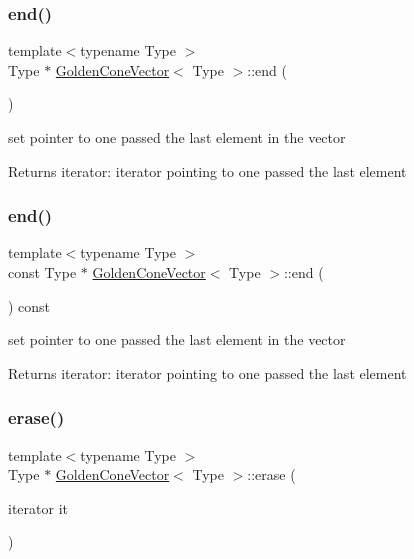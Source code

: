 \subsubsection{\texorpdfstring{end()}{end()}\hspace{0.1cm}{\footnotesize\ttfamily [1/2]}}
{\footnotesize\ttfamily template$<$typename Type $>$ \\
Type $\ast$ \mbox{\hyperlink{class_golden_cone_vector}{Golden\+Cone\+Vector}}$<$ Type $>$\+::end (\begin{DoxyParamCaption}{ }\end{DoxyParamCaption})}



set pointer to one passed the last element in the vector 

\begin{DoxyReturn}{Returns}
iterator\+: iterator pointing to one passed the last element 
\end{DoxyReturn}
\mbox{\label{class_golden_cone_vector_a7962ba599356afbbfc2e21ac58fceb2b}} 
\subsubsection{\texorpdfstring{end()}{end()}\hspace{0.1cm}{\footnotesize\ttfamily [2/2]}}
{\footnotesize\ttfamily template$<$typename Type $>$ \\
const Type $\ast$ \mbox{\hyperlink{class_golden_cone_vector}{Golden\+Cone\+Vector}}$<$ Type $>$\+::end (\begin{DoxyParamCaption}{ }\end{DoxyParamCaption}) const}



set pointer to one passed the last element in the vector 

\begin{DoxyReturn}{Returns}
iterator\+: iterator pointing to one passed the last element 
\end{DoxyReturn}
\mbox{\label{class_golden_cone_vector_a27534fb2287d04adae0d1e92aef8f062}} 
\subsubsection{\texorpdfstring{erase()}{erase()}}
{\footnotesize\ttfamily template$<$typename Type $>$ \\
Type $\ast$ \mbox{\hyperlink{class_golden_cone_vector}{Golden\+Cone\+Vector}}$<$ Type $>$\+::erase (\begin{DoxyParamCaption}\item[{iterator}]{it }\end{DoxyParamCaption})}



